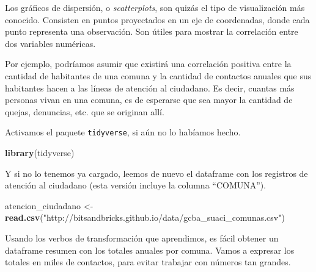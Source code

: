 \documentclass[spanish,]{book}
\newenvironment{Shaded}{\begin{snugshade}}{\end{snugshade}}
\newcommand{\DataTypeTok}[1]{\textcolor[rgb]{0.13,0.29,0.53}{#1}}
\newcommand{\DecValTok}[1]{\textcolor[rgb]{0.00,0.00,0.81}{#1}}
\newcommand{\KeywordTok}[1]{\textcolor[rgb]{0.13,0.29,0.53}{\textbf{#1}}}
\newcommand{\NormalTok}[1]{#1}
\newcommand{\OperatorTok}[1]{\textcolor[rgb]{0.81,0.36,0.00}{\textbf{#1}}}
\newcommand{\StringTok}[1]{\textcolor[rgb]{0.31,0.60,0.02}{#1}}
\begin{document}
Los gráficos de dispersión, o \emph{scatterplots}, son quizás el tipo de visualización más conocido. Consisten en puntos proyectados en un eje de coordenadas, donde cada punto representa una observación. Son útiles para mostrar la correlación entre dos variables numéricas.

Por ejemplo, podríamos asumir que existirá una correlación positiva entre la cantidad de habitantes de una comuna y la cantidad de contactos anuales que sus habitantes hacen a las líneas de atención al ciudadano. Es decir, cuantas más personas vivan en una comuna, es de esperarse que sea mayor la cantidad de quejas, denuncias, etc. que se originan allí.

Activamos el paquete \texttt{tidyverse}, si aún no lo habíamos hecho.

\begin{Shaded}
\begin{Highlighting}[]
\KeywordTok{library}\NormalTok{(tidyverse)}
\end{Highlighting}
\end{Shaded}

Y si no lo tenemos ya cargado, leemos de nuevo el dataframe con los registros de atención al ciudadano (esta versión incluye la columna ``COMUNA'').

\begin{Shaded}
\begin{Highlighting}[]
\NormalTok{atencion_ciudadano <-}\StringTok{ }\KeywordTok{read.csv}\NormalTok{(}\StringTok{"http://bitsandbricks.github.io/data/gcba_suaci_comunas.csv"}\NormalTok{)}
\end{Highlighting}
\end{Shaded}

Usando los verbos de transformación que aprendimos, es fácil obtener un dataframe resumen con los totales anuales por comuna. Vamos a expresar los totales en miles de contactos, para evitar trabajar con números tan grandes.

\begin{Shaded}
\end{Shaded}
\end{document}
